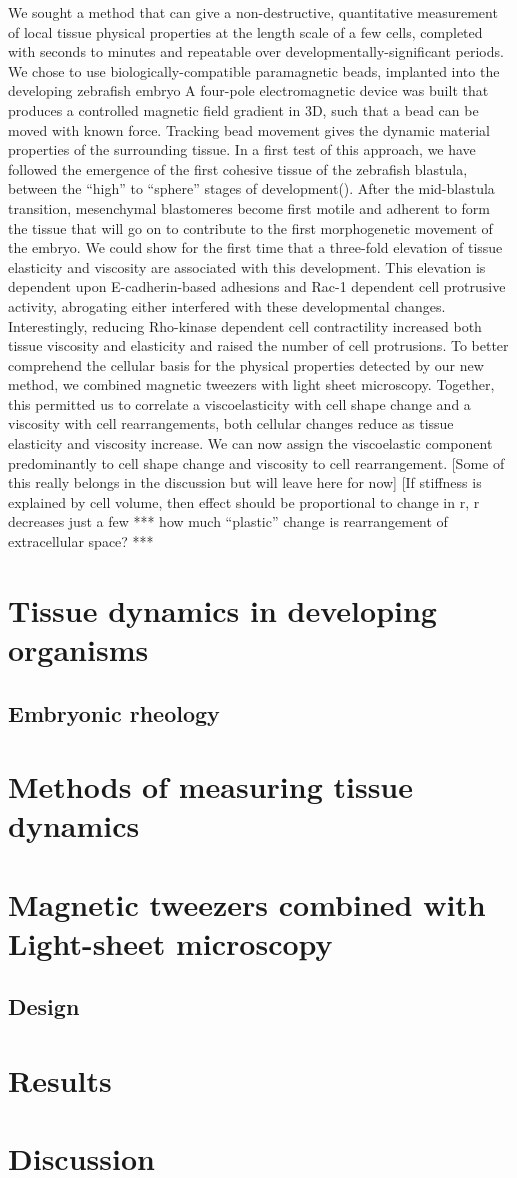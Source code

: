 We sought a method that can give a non-destructive, quantitative measurement of local tissue physical properties at the length scale of a few cells, completed with seconds to minutes and repeatable over developmentally-significant periods.
We chose to use biologically-compatible paramagnetic beads, implanted into the developing zebrafish embryo
A four-pole electromagnetic device was built that produces a controlled magnetic field gradient in 3D, such that a bead can be moved with known force.
Tracking bead movement gives the dynamic material properties of the surrounding tissue. In a first test of this approach, we have followed the emergence of the first cohesive tissue of the zebrafish blastula, between the “high” to “sphere” stages of development(). After the mid-blastula transition, mesenchymal blastomeres become first motile and adherent to form the tissue that will go on to contribute to the first morphogenetic movement of the embryo.
We could show for the first time that a three-fold elevation of tissue elasticity and viscosity  are associated with this development.
This elevation is dependent upon E-cadherin-based adhesions and Rac-1 dependent cell protrusive activity, abrogating either interfered with these developmental changes. Interestingly, reducing Rho-kinase dependent cell contractility increased both tissue viscosity and elasticity  and raised the number of cell protrusions.
To better comprehend the cellular basis for the physical properties detected by our new method, we combined magnetic tweezers with light sheet microscopy.
Together, this permitted us to correlate a viscoelasticity with cell shape change and a viscosity with cell rearrangements, both cellular changes reduce as tissue elasticity and viscosity increase.
We can now assign the viscoelastic component predominantly to cell shape change and viscosity to cell rearrangement.
[Some of this really belongs in the discussion but will leave here for now]
[If stiffness is explained by cell volume, then effect should be proportional to change in r, r decreases just a few %
*** how much “plastic” change is rearrangement of extracellular space? ***


\section{Tissue dynamics in developing organisms}
\subsection{Embryonic rheology}
\section{Methods of measuring tissue dynamics}
\section{Magnetic tweezers combined with Light-sheet microscopy}
\subsection{Design}
\section{Results}
\section{Discussion}

